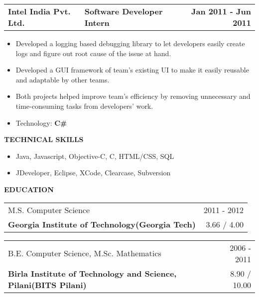 \documentclass[a4paper]{article}
\makeatletter
\newcommand{\resumesection}[1]{
	\vspace*{-0.5\baselineskip}
	\begin{flushleft}
		\large{\textbf{\uppercase{#1}}}
	\end{flushleft}
} %
\newcommand{\experiencesubsection}[3]{
	\begin{tabular*}{1.0\textwidth}{@{\extracolsep{\fill}} p{7cm} l r}
		\textbf{#1} & \textbf{#2} & \textbf{#3}
	\end{tabular*}
} %
\newcommand{\educationsubsection}[4]{
	\begin{tabular*}{1.0\textwidth}{@{\extracolsep{\fill}} l r}
		#1 & #2 \\
		\textbf{#3} & #4\\
	\end{tabular*}
} %
\newcommand{\techitem}[1]{\item Technology: \textbf{#1}} %
\newcommand{\customitemizespacing}{\addtolength{\itemsep}{-0.5\baselineskip}}
\makeatother
\begin{document}
\experiencesubsection{Intel India Pvt. Ltd.}{Software Developer Intern}{Jan 2011 - Jun 2011}
\begin{itemize}
	\item Developed a logging based debugging library to let developers easily create logs and figure out root cause of the issue at hand.
	\item Developed a GUI framework of team's existing UI to make it easily reusable and adaptable by other teams.
	\item Both projects helped improve team's efficiency by removing unnecessary and time-consuming tasks from developers' work.
	\techitem{C\#}
\end{itemize}


\resumesection{Technical Skills}
\begin{itemize}
	\item Java, Javascript, Objective-C, C, HTML/CSS, SQL
	\item JDeveloper, Eclipse, XCode, Clearcase, Subversion
\end{itemize}

\resumesection{Education}
\educationsubsection{M.S. Computer Science}{2011 - 2012}{Georgia Institute of Technology(Georgia Tech)}{3.66 / 4.00}
\newline
\educationsubsection{B.E. Computer Science, M.Sc. Mathematics}{2006 - 2011}{Birla Institute of Technology and Science, Pilani(BITS Pilani)}{8.90 / 10.00}
\end{document}
